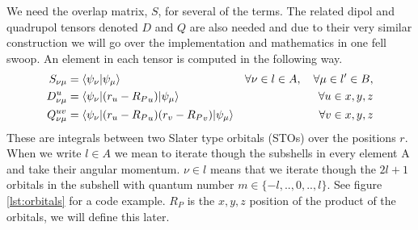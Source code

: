 We need the overlap matrix, $S$, for several of the terms. 
The related dipol and quadrupol tensors denoted $D$ and $Q$ are also needed and due to their very similar construction we will go over the implementation and mathematics in one fell swoop. 
An element in each tensor is computed in the following way.
\begin{align}
    S_{\nu\mu} &= \braket{\psi_\nu|\psi_\mu} &\forall \nu \in l \in A,\quad\forall\mu \in l' \in B, \\
    D_{\nu\mu}^{u} &= \braket{\psi_\nu|(r_u-{R_P}_u)|\psi_\mu}  &\forall  u\in x,y,z\\
    Q_{\nu\mu}^{uv} &= \braket{\psi_\nu|(r_u-{R_P}_u)(r_v-{R_P}_v)|\psi_\mu} &\forall  v\in x,y,z
\end{align}
These are integrals between two Slater type orbitals (STOs) over the positions $r$. When we write $l \in A$ we mean to iterate though the subshells in every element A and take their angular momentum. $\nu\in l$ means that we iterate though the $2l+1$ orbitals in the subshell with quantum number $m\in\{-l,..,0,..,l\}$. See figure \ref{lst:orbitals} for a code example. ${R_P}$ is the $x,y,z$ position of the product of the orbitals, we will define this later.

